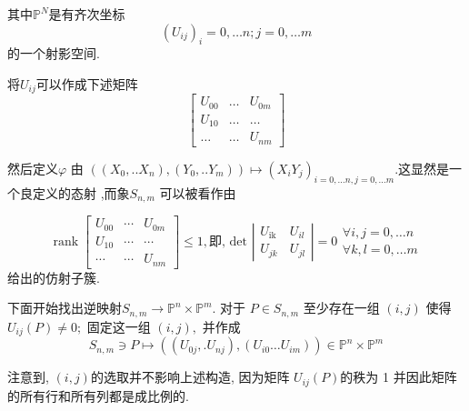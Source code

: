 \documentclass[UTF8]{book}
\begin{document}
		
		其中$\mathbb{P}^{ N}$是有齐次坐标
		\begin{equation*}
		\left(U_{i j}\right)_{i}=0, \ldots n; j=0,\ldots m
		\end{equation*}
		的一个射影空间.
		
		
		将$ U_{ij} $可以作成下述矩阵
		\begin{equation*}
		\left[\begin{array}{ccc} 
		U _{ 00} & \dots & U _{ 0m } \\
		U _{10} & \dots & \dots \\
		\dots & \dots & U _{ nm }
		\end{array}\right]
		\end{equation*}
		
		
		然后定义$\varphi$ 由 $\left(\left( X _{0}, . . X _{ n }\right),\left( Y _{0}, . . Y _{ m }\right)\right) \mapsto\left( X _{ i } Y _{ j }\right)_{ i =0, \ldots n, j =0, \ldots m}  $.这显然是一个良定义的态射 ,而象$S_{n, m}$ 可以被看作由
		
		\begin{equation*}
		\operatorname{rank}\left[\begin{array}{ccc} 
		U _{00} & \cdots & U _{ 0m } \\
		U _{10} & \cdots & \cdots \\
		\cdots & \cdots & U _{ nm }
		\end{array}\right] \leq 1, \text {即, det }\left|\begin{array}{cc} 
		U _{\text {ik }} & U _{ i l} \\
		U _{ jk } & U _{ j l}
		\end{array}\right|=0 \begin{array}{l}
		\forall i , j =0,\ldots n \\
		\forall k , l=0,\ldots m
		\end{array}
		\end{equation*}
		给出的仿射子簇.
		
		
		下面开始找出逆映射$S _{ n , m } \rightarrow \mathbb{P}^{n} \times \mathbb{P}^{m}$. 对于 $P \in S _{ n , m }$ 至少存在一组 $(i, j)$ 使得 $U_{i j}(P) \neq 0 ;$ 固定这一组 $(i, j),$ 并作成
		\begin{equation*}
		S _{ n , m } \ni P \mapsto\left(\left( U _{0 j }, . U _{ n j}\right),\left( U _{ i 0} \ldots U _{ im }\right)\right) \in \mathbb{P} ^{ n } \times \mathbb{P}^{ m}
		\end{equation*}
		
		
		注意到, $(i, j)$的选取并不影响上述构造, 因为矩阵 $U_{i j}(P)$的秩为 1 并因此矩阵的所有行和所有列都是成比例的.
		
\end{document}
